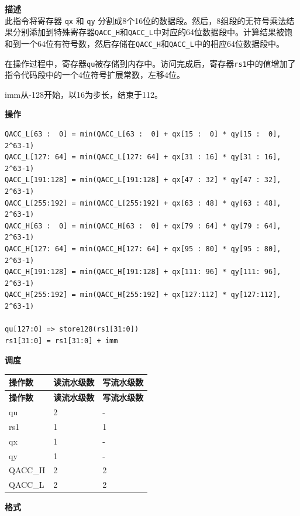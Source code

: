 \textbf{描述}\\
此指令将寄存器 \lstinline{qx} 和 \lstinline{qy} 分割成8个16位的数据段。然后，8组段的无符号乘法结果分别添加到特殊寄存器\lstinline{QACC_H}和\lstinline{QACC_L}中对应的64位数据段中。计算结果被饱和到一个64位有符号数，然后存储在\lstinline{QACC_H}和\lstinline{QACC_L}中的相应64位数据段中。

在操作过程中，寄存器\lstinline{qu}被存储到内存中。访问完成后，寄存器\lstinline{rs1}中的值增加了指令代码段中的一个4位符号扩展常数，左移4位。

imm从-128开始，以16为步长，结束于112。

\textbf{操作}\\
\begin{lstlisting}
QACC_L[63 :  0] = min(QACC_L[63 :  0] + qx[15 :  0] * qy[15 :  0], 2^63-1)
QACC_L[127: 64] = min(QACC_L[127: 64] + qx[31 : 16] * qy[31 : 16], 2^63-1)
QACC_L[191:128] = min(QACC_L[191:128] + qx[47 : 32] * qy[47 : 32], 2^63-1)
QACC_L[255:192] = min(QACC_L[255:192] + qx[63 : 48] * qy[63 : 48], 2^63-1)
QACC_H[63 :  0] = min(QACC_H[63 :  0] + qx[79 : 64] * qy[79 : 64], 2^63-1)
QACC_H[127: 64] = min(QACC_H[127: 64] + qx[95 : 80] * qy[95 : 80], 2^63-1)
QACC_H[191:128] = min(QACC_H[191:128] + qx[111: 96] * qy[111: 96], 2^63-1)
QACC_H[255:192] = min(QACC_H[255:192] + qx[127:112] * qy[127:112], 2^63-1)

qu[127:0] => store128(rs1[31:0])
rs1[31:0] = rs1[31:0] + imm
\end{lstlisting}

\textbf{调度}\\
\begin{longtable}[c]{|l|l|l|}
    \hline
    \rowcolor{lightgray}
    \textbf{操作数} & \textbf{读流水级数} & \textbf{写流水级数} \\\hline
    \endfirsthead
    \hline
    \rowcolor{lightgray}
     \textbf{操作数} & \textbf{读流水级数} & \textbf{写流水级数} \\\hline
    \endhead
    \hline
    \endfoot

    qu & 2 & - \\\hline
    rs1 & 1 & 1 \\\hline
     qx & 1 & - \\\hline
     qy & 1 & - \\\hline
     QACC\_H & 2 & 2 \\\hline
     QACC\_L & 2 & 2

\end{longtable}

\textbf{格式}\\

